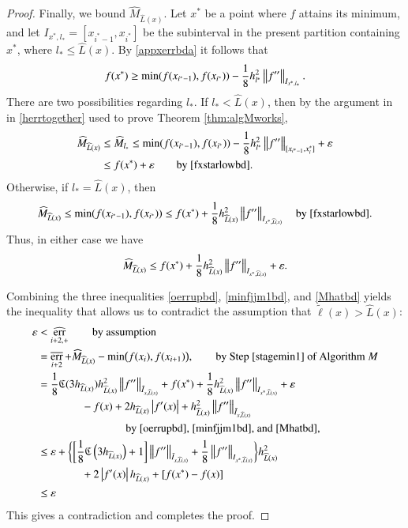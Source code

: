 \documentclass[review]{elsarticle}
\newcommand{\abstol}{\varepsilon}
\theoremstyle{definition}
\newcommand{\tell}{\tilde{\ell}}
\newcommand{\chL}{\widehat{L}}
\newcommand{\hM}{\widehat{M}}
\DeclareMathOperator{\oerr}{\overline{err}}
\DeclareMathOperator{\herr}{\widehat{err}}
\begin{document}
\begin{proof}
Finally, we bound $ \hM_{\chL(x)}$. Let $x^*$ be a point where $f$ attains its minimum, 
and 
let $I_{x^*,l_*} = [x_{i^*-1}, x_{i^*}]$ be the subinterval in the present partition containing 
$x^*$, where $l_* \le \chL(x)$. By
\eqref{appxerrbda} it follows that
\begin{equation} \label{fxstarlowbd}
f(x^*) \ge \min(f(x_{i^*-1}),f(x_{i^*})) - \frac18 h_{l^*}^2\norm[I_{x^*,l_*}]{f''}.
\end{equation}
There are two possibilities regarding $l_*$. If $l_* < \chL(x)$, then by the argument in  in 
\eqref{herrtogether} used to prove Theorem \ref{thm:algMworks},
\begin{align*}
\hM_{\chL(x)}   & \le \hM_{l_*}  
\le \min(f(x_{i^*-1}),f(x_{i^*})) - \frac18 h_{l^*}^2 \norm[{[x_{i^*-1}, x^*_i]}]{f''}  + \abstol  \\
& \le  f(x^*) + \abstol \qquad \text{by}~\eqref{fxstarlowbd} .
\end{align*}
Otherwise, if $l_* = \chL(x)$, then 
\begin{equation*}
\hM_{\chL(x)}   \le \min(f(x_{i^*-1}),f(x_{i^*}))  \le  f(x^*) + \frac18 h_{\chL(x)}^2 
\norm[{I_{x^*,\chL(x)}}]{f''} \quad \text{by}~\eqref{fxstarlowbd} .
\end{equation*}
Thus, in either case we have
\begin{equation} \label{Mhatbd}
\hM_{\chL(x)} \le f(x^*) + \frac 18 h_{\chL(x)}^2  \norm[{I_{x^*,\chL(x)}}]{f''} + \abstol.
\end{equation}

Combining the three inequalities \eqref{oerrupbd}, \eqref{minfjjm1bd}, and
\eqref{Mhatbd} yields the inequality that allows us to contradict the assumption
that $\tell(x) > \chL(x)$:
\begin{align*}
\abstol & < \herr_{i+2,+} \qquad \text{by assumption} \\
& = \oerr_{i+2} + \hM_{\chL(x)} - \min\bigl(f(x_{i}),f(x_{i+1})\bigr), \qquad \text{by Step 
\ref{stagemin1} of Algorithm $M$} \\
& = \frac{1}{8} \fC(3 h_{\chL(x)}) h_{\chL(x)}^2 \norm[\tilde{I}_{x,\chL(x)}]{f''} + f(x^*) + 
\frac 18 h_{\chL(x)}^2  \norm[{I_{x^*,\chL(x)}}]{f''} + \abstol \\
& \qquad \qquad - f(x) + 2h_{\chL(x)}\abs{f'(x)} + h_{\chL(x)}^2 
\norm[\bar{I}_{x,\chL(x)}]{f''} \\
&  \qquad \qquad \qquad  \qquad \text{by \eqref{oerrupbd}, \eqref{minfjjm1bd}, and 
\eqref{Mhatbd},} \\
& \le \abstol + \biggl\{ \biggl[\frac 18 \fC\left(3 h_{\chL(x)} \right) + 1 \biggr]   
\norm[\tilde{I}_{x,\chL(x)}]{f''} + \frac18\norm[{I_{x^*,\chL(x)}}]{f''} \biggr\} h_{\chL(x)}^2 \\
& \qquad \qquad +  2 \abs{f'(x)} h_{\chL(x)} + [f(x^*) - f(x)] \\
& \le \abstol
\end{align*}
This gives a contradiction and completes the proof.
\end{proof}
\end{document}
